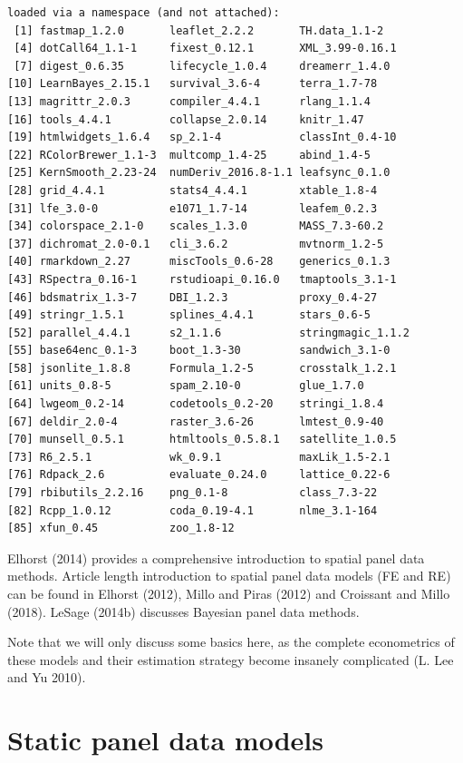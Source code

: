 \documentclass[
  letterpaper,
  DIV=11,
  numbers=noendperiod]{scrreprt}
\begin{document}
\begin{verbatim}
loaded via a namespace (and not attached):
 [1] fastmap_1.2.0       leaflet_2.2.2       TH.data_1.1-2      
 [4] dotCall64_1.1-1     fixest_0.12.1       XML_3.99-0.16.1    
 [7] digest_0.6.35       lifecycle_1.0.4     dreamerr_1.4.0     
[10] LearnBayes_2.15.1   survival_3.6-4      terra_1.7-78       
[13] magrittr_2.0.3      compiler_4.4.1      rlang_1.1.4        
[16] tools_4.4.1         collapse_2.0.14     knitr_1.47         
[19] htmlwidgets_1.6.4   sp_2.1-4            classInt_0.4-10    
[22] RColorBrewer_1.1-3  multcomp_1.4-25     abind_1.4-5        
[25] KernSmooth_2.23-24  numDeriv_2016.8-1.1 leafsync_0.1.0     
[28] grid_4.4.1          stats4_4.4.1        xtable_1.8-4       
[31] lfe_3.0-0           e1071_1.7-14        leafem_0.2.3       
[34] colorspace_2.1-0    scales_1.3.0        MASS_7.3-60.2      
[37] dichromat_2.0-0.1   cli_3.6.2           mvtnorm_1.2-5      
[40] rmarkdown_2.27      miscTools_0.6-28    generics_0.1.3     
[43] RSpectra_0.16-1     rstudioapi_0.16.0   tmaptools_3.1-1    
[46] bdsmatrix_1.3-7     DBI_1.2.3           proxy_0.4-27       
[49] stringr_1.5.1       splines_4.4.1       stars_0.6-5        
[52] parallel_4.4.1      s2_1.1.6            stringmagic_1.1.2  
[55] base64enc_0.1-3     boot_1.3-30         sandwich_3.1-0     
[58] jsonlite_1.8.8      Formula_1.2-5       crosstalk_1.2.1    
[61] units_0.8-5         spam_2.10-0         glue_1.7.0         
[64] lwgeom_0.2-14       codetools_0.2-20    stringi_1.8.4      
[67] deldir_2.0-4        raster_3.6-26       lmtest_0.9-40      
[70] munsell_0.5.1       htmltools_0.5.8.1   satellite_1.0.5    
[73] R6_2.5.1            wk_0.9.1            maxLik_1.5-2.1     
[76] Rdpack_2.6          evaluate_0.24.0     lattice_0.22-6     
[79] rbibutils_2.2.16    png_0.1-8           class_7.3-22       
[82] Rcpp_1.0.12         coda_0.19-4.1       nlme_3.1-164       
[85] xfun_0.45           zoo_1.8-12         
\end{verbatim}

Elhorst (2014) provides a comprehensive introduction to spatial panel
data methods. Article length introduction to spatial panel data models
(FE and RE) can be found in Elhorst (2012), Millo and Piras (2012) and
Croissant and Millo (2018). LeSage (2014b) discusses Bayesian panel data
methods.

Note that we will only discuss some basics here, as the complete
econometrics of these models and their estimation strategy become
insanely complicated (L. Lee and Yu 2010).

\hypertarget{static-panel-data-models}{%
\section{Static panel data models}\label{static-panel-data-models}}
\end{document}

